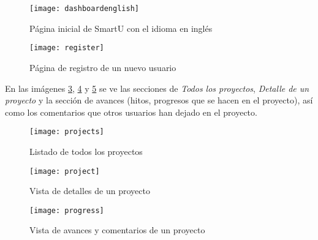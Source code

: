 \begin{figure}
    \centering
    \texttt{[image: dashboardenglish]}
    \caption{Página inicial de SmartU con el idioma en inglés}
    \label{dashboardenglish}
\end{figure}

\begin{figure}
    \centering
    \texttt{[image: register]}
    \caption{Página de registro de un nuevo usuario}
    \label{register}
\end{figure}

En las imágenes \ref{projects}, \ref{project} y \ref{progress} se ve las secciones de \textit{Todos los proyectos}, \textit{Detalle de un proyecto} y la sección de avances (hitos, progresos que se hacen en el proyecto), así como los comentarios que otros usuarios han dejado en el proyecto.

\begin{figure}
    \centering
    \texttt{[image: projects]}
    \caption{Listado de todos los proyectos}
    \label{projects}
\end{figure}

\begin{figure}
    \centering
    \texttt{[image: project]}
    \caption{Vista de detalles de un proyecto}
    \label{project}
\end{figure}

\begin{figure}
    \centering
    \texttt{[image: progress]}
    \caption{Vista de avances y comentarios de un proyecto}
    \label{progress}
\end{figure}
